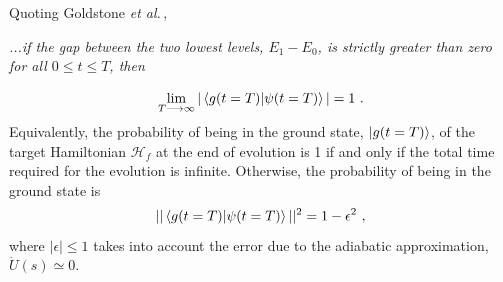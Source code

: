 \newpage
Quoting Goldstone \textit{et al.}\,\cite{Farhi2000QuantumEvolution},
\begin{displayquote}
\textit{...if the gap between the two lowest levels, $E_{1} - E_{0}$, is strictly greater than zero for all $0 \leq t \leq T$, then}
\end{displayquote}
\begin{equation}
    \lim_{T\longrightarrow \infty} | \braket{g(t=T) | \psi(t=T)}| = 1\ .
\end{equation}
Equivalently, the probability of being in the ground state, $\ket{g(t=T)}$, of the target Hamiltonian $\mathcal{H}_{f}$ at the end of evolution is 1 if and only if the total time required for the evolution is infinite. Otherwise, the probability of being in the ground state is
\begin{equation}
    || \braket{g(t=T) | \psi(t=T)}||^{2} = 1 - \epsilon^{2}\ ,
\end{equation}
where $|\epsilon| \leq 1$ takes into account the error due to the adiabatic approximation, $\dot{U}(s) \simeq 0$.
